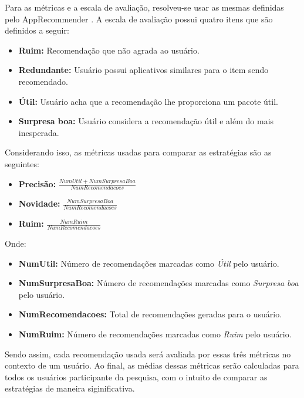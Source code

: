 Para as métricas e a escala de avaliação, resolveu-se usar as mesmas definidas
pelo AppRecommender \cite{araujo2011apprecommender}. A escala de avaliação
possui quatro itens que são definidos a seguir:

\begin{itemize}
    \item \textbf{Ruim: } Recomendação que não agrada ao usuário.
    \item \textbf{Redundante: } Usuário possui aplicativos similares para o item
        sendo recomendado.
    \item \textbf{Útil: } Usuário acha que a recomendação lhe proporciona um
            pacote útil.
    \item \textbf{Surpresa boa: } Usuário considera a recomendação útil e além
        do mais inesperada.
\end{itemize}

Considerando isso, as métricas usadas para comparar as estratégias são as
seguintes:

\begin{itemize}
    \item \textbf{Precisão: } $\frac{NumUtil + NumSurpresaBoa}{NumRecomendacoes}$
    \item \textbf{Novidade: } $\frac{NumSurpresaBoa}{NumRecomendacoes}$
    \item \textbf{Ruim: } $\frac{NumRuim}{NumRecomendacoes}$
\end{itemize}

Onde:

\begin{itemize}
    \item \textbf{NumUtil:} Número de recomendações marcadas como \textit{Útil}
        pelo usuário.
    \item \textbf{NumSurpresaBoa:} Número de recomendações marcadas como
        \textit{Surpresa boa} pelo usuário.
    \item \textbf{NumRecomendacoes:} Total de recomendações geradas para o
        usuário.
    \item \textbf{NumRuim:} Número de recomendações marcadas como \textit{Ruim}
        pelo usuário.
\end{itemize}

Sendo assim, cada recomendação usada será avaliada por essas três métricas no
contexto de um usuário. Ao final, as médias dessas métricas serão calculadas para
todos os usuários participante da pesquisa, com o intuito de comparar as
estratégias de maneira siginificativa.
